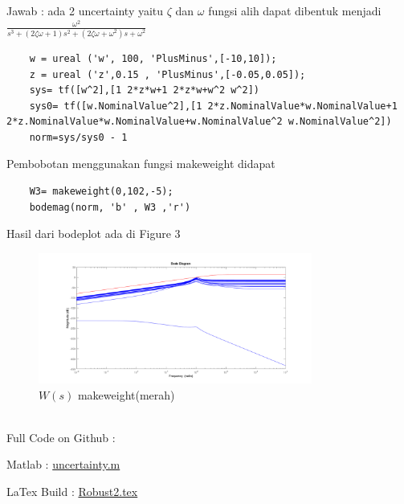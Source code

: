 \documentclass[14pt]{article}
\begin{document}
Jawab : ada 2 uncertainty yaitu $\zeta$ dan $\omega$ fungsi alih dapat dibentuk menjadi $   \frac{\omega ^2}{s^3+(2 \zeta   \omega +1)s^2+(2 \zeta   \omega + \omega ^2)s+\omega ^2} $
\begin{verbatim}
    w = ureal ('w', 100, 'PlusMinus',[-10,10]);
    z = ureal ('z',0.15 , 'PlusMinus',[-0.05,0.05]);
    sys= tf([w^2],[1 2*z*w+1 2*z*w+w^2 w^2])
    sys0= tf([w.NominalValue^2],[1 2*z.NominalValue*w.NominalValue+1 2*z.NominalValue*w.NominalValue+w.NominalValue^2 w.NominalValue^2])
    norm=sys/sys0 - 1
\end{verbatim}
Pembobotan menggunakan fungsi makeweight didapat
\begin{verbatim}
    W3= makeweight(0,102,-5);
    bodemag(norm, 'b' , W3 ,'r')
\end{verbatim}
Hasil dari bodeplot ada di Figure 3
\begin{figure}[h]
    \centering
    \includegraphics[width=90mm]{makeweight3.png}
    \caption{$W(s)$ makeweight(merah) \label{overflow}}
\end{figure}\\

Full Code on  Github :

Matlab : \href{https://github.com/utamadonny/matlabcolle/blob/master/KendaliNew/uncertainty.m}{uncertainty.m}

LaTex Build : \href{https://github.com/utamadonny/BelajarLatex/blob/master/Robust2/Robust2.tex}{Robust2.tex}
\end{document}
